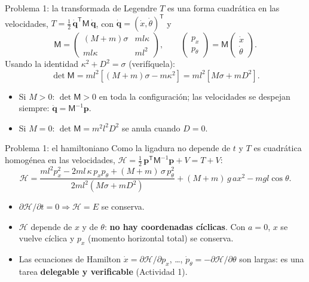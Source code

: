 \documentclass[spanish]{beamer}
\newcommand{\Ham}{\mathcal{H}}
\begin{document}
\begin{frame}{Problema 1: la transformada de Legendre}
$T$ es una forma cuadrática en las velocidades,
$T=\tfrac12\,\dot{\mathbf q}^{\mathsf T}\mathsf M\,\dot{\mathbf q}$, con
$\dot{\mathbf q}=(\dot x,\dot\theta)^{\mathsf T}$ y
\[
  \mathsf M = \begin{pmatrix} (M+m)\sigma & m l \kappa \\ m l\kappa & m l^2 \end{pmatrix},
  \qquad
  \begin{pmatrix} p_x \\ p_\theta \end{pmatrix} = \mathsf M
  \begin{pmatrix} \dot x \\ \dot\theta \end{pmatrix}.
\]
\pause
Usando la identidad $\kappa^2 + D^2 = \sigma$ (verifíquela):
\[
  \det \mathsf M = m l^2 \left[ (M+m)\sigma - m\kappa^2 \right]
                 = m l^2 \left[ M\sigma + m D^2 \right] .
\]
\pause
\begin{itemize}
  \item Si $M>0$: $\det\mathsf M>0$ en toda la configuración; las velocidades se
        despejan siempre: $\dot{\mathbf q}=\mathsf M^{-1}\mathbf p$.
  \item Si $M=0$: $\det\mathsf M = m^2l^2D^2$ \alert{se anula cuando $D=0$}.
\end{itemize}
\end{frame}

\begin{frame}{Problema 1: el hamiltoniano}
Como la ligadura no depende de $t$ y $T$ es cuadrática homogénea en las
velocidades, $\Ham = \tfrac12\,\mathbf p^{\mathsf T}\mathsf M^{-1}\mathbf p + V = T+V$:
\[
  \Ham = \frac{m l^2 p_x^2 - 2 m l\,\kappa\, p_x p_\theta + (M+m)\,\sigma\, p_\theta^2}
              {2 m l^2 \left( M\sigma + m D^2 \right)}
         + (M+m)\,g\,a x^2 - m g l\cos\theta .
\]
\pause
\begin{itemize}
  \item<2-> $\partial\Ham/\partial t = 0 \Rightarrow \Ham = E$ se conserva.
  \item<3-> $\Ham$ depende de $x$ y de $\theta$: \textbf{no hay coordenadas cíclicas}.
        Con $a=0$, $x$ se vuelve cíclica y $p_x$ (momento horizontal total) se conserva.
  \item<4-> Las ecuaciones de Hamilton $\dot x = \partial\Ham/\partial p_x$, \ldots,
        $\dot p_\theta = -\partial\Ham/\partial\theta$ son largas: es una tarea
        \textbf{delegable y verificable} (Actividad 1).
\end{itemize}
\end{frame}
\end{document}
